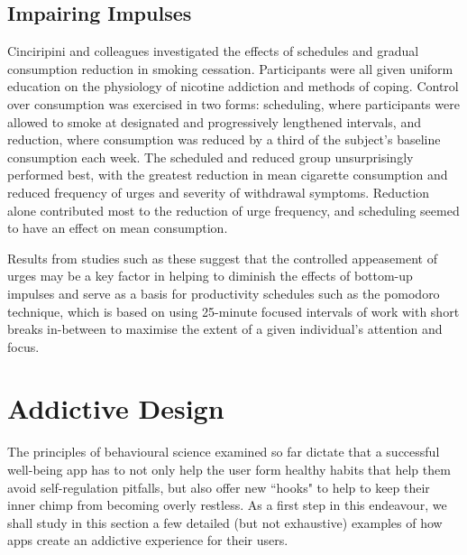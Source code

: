 \subsection{Impairing Impulses}
Cinciripini and colleagues \cite{cinciripini1995effects} investigated the effects of schedules and gradual consumption reduction in smoking cessation. Participants were all given uniform education on the physiology of nicotine addiction and methods of coping. Control over consumption was exercised in two forms: scheduling, where participants were allowed to smoke at designated and progressively lengthened intervals, and reduction, where consumption was reduced by a third of the subject's baseline consumption each week. The scheduled and reduced group unsurprisingly performed best, with the greatest reduction in mean cigarette consumption and reduced frequency of urges and severity of withdrawal symptoms. Reduction alone contributed most to the reduction of urge frequency, and scheduling seemed to have an effect on mean consumption.

Results from studies such as these suggest that the controlled appeasement of urges may be a key factor in helping to diminish the effects of bottom-up impulses and serve as a basis for productivity schedules such as the pomodoro technique, which is based on using 25-minute focused intervals of work with short breaks in-between to maximise the extent of a given individual's attention and focus.

\section{Addictive Design}
The principles of behavioural science examined so far dictate that a successful well-being app has to not only help the user form healthy habits that help them avoid self-regulation pitfalls, but also offer new ``hooks" to help to keep their inner chimp from becoming overly restless. As a first step in this endeavour, we shall study in this section a few detailed (but not exhaustive) examples of how apps create an addictive experience for their users.

